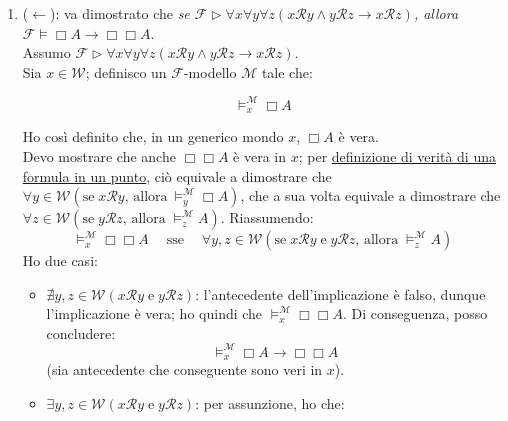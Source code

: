 \documentclass[a4paper,12pt]{article}
\begin{document}
\begin{dimo}
\begin{enumerate}
		\item ($\leftarrow$): va dimostrato che \emph{se $\mathcal{F} \rhd \forall x \forall y \forall z (x\mathcal{R}y \land y\mathcal{R}z \to x\mathcal{R}z)$, allora $\mathcal{F} \vDash \Box A \to \Box \Box A$}. \\
		Assumo $\mathcal{F} \rhd \forall x \forall y \forall z (x\mathcal{R}y \land y\mathcal{R}z \to x\mathcal{R}z)$. \\
		Sia $x \in \mathcal{W}$; definisco un $\mathcal{F}$-modello $\mathcal{M}$ tale che: \\ 
		
		\begin{minipage}{0.48\textwidth}
			$$\vDash_x^{\mathcal{M}}\Box A$$
		\end{minipage}
		\begin{minipage}{0.48\textwidth}
			\begin{center}
			\end{center}
		\end{minipage}
		\vspace{8pt}
		
		Ho così definito che, in un generico mondo $x$, $\Box A$ è vera. \\
		Devo mostrare che anche $\Box \Box A$ è vera in $x$; per \hyperlink{defverp}{definizione di verità di una formula in un punto}, ciò equivale a dimostrare che $\forall y \in \mathcal{W} (\text{se} \; x\mathcal{R}y  \text{, allora} \: \vDash_y^{\mathcal{M}} \Box A)$, che a sua volta equivale a dimostrare che $\forall z \in \mathcal{W} (\text{se} \; y\mathcal{R}z  \text{, allora} \; \vDash_z^{\mathcal{M}} A)$. Riassumendo:
		$$\vDash_x^{\mathcal{M}} \Box \Box A \quad \; \text{sse} \; \quad \forall y, z \in \mathcal{W} (\text{se} \; x\mathcal{R}y \; \text{e} \; y\mathcal{R}z  \text{, allora} \; \vDash_z^{\mathcal{M}} A)$$
		Ho due casi:
		\begin{itemize}
			\item $\nexists y, z \in \mathcal{W}(x\mathcal{R}y \; \text{e} \; y\mathcal{R}z)$: l'antecedente dell'implicazione è falso, dunque l'implicazione è vera; ho quindi che $\vDash_x^{\mathcal{M}} \Box \Box A$. Di conseguenza, posso concludere:
			$$\vDash_x^{\mathcal{M}} \Box A \to \Box \Box A$$
			(sia antecedente che conseguente sono veri in $x$).
			\item $\exists y, z \in \mathcal{W}(x\mathcal{R}y \; \text{e} \; y\mathcal{R}z)$: 
			per assunzione, ho che: 
			\vspace{8pt}
			

\end{itemize}
\end{enumerate}
\end{dimo}
\end{document}
